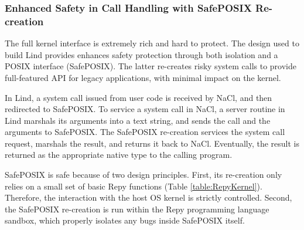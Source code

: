 {\subsubsection{Enhanced Safety in Call Handling with SafePOSIX Re-creation}

The full kernel interface is extremely rich and hard to protect.
The \lip design used to build Lind provides enhances
safety protection through both isolation and a POSIX interface (SafePOSIX). The
latter re-creates risky system calls to
provide full-featured API for legacy applications, with minimal impact on the kernel.

In Lind, a system call issued from user code is
received by NaCl, and then redirected to SafePOSIX.
To service a system call in NaCl, a server routine in
Lind marshals its arguments into a text string, and sends the call and the arguments
to SafePOSIX. The SafePOSIX re-creation services the system call request, marshals the result, and
returns it back to NaCl. Eventually, the result is returned as the appropriate
native type to the calling program.

SafePOSIX is safe because of two design principles.
First, its re-creation only relies on a small set of basic Repy functions (Table \ref{table:RepyKernel}).
Therefore, the interaction with the host OS kernel is strictly controlled.
Second, the SafePOSIX re-creation is run within the Repy programming language sandbox,
which properly isolates any bugs inside SafePOSIX itself.



}
